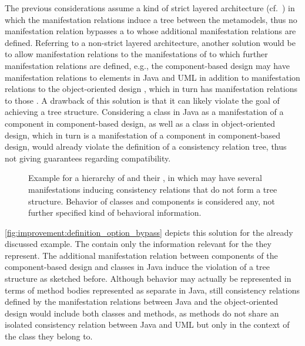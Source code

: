 The previous considerations assume a kind of strict layered architecture (cf.~\cite{buschmann1996PatternsArchitecture-Book}) in which the manifestation relations induce a tree between the metamodels, thus no manifestation relation bypasses a \conceptmetamodel to whose \commonalities additional manifestation relations are defined.
Referring to a non-strict layered architecture, another solution would be to allow manifestation relations to the manifestations of \conceptmetamodels to which further manifestation relations are defined, e.g., the component-based design \commonalities may have manifestation relations to elements in Java and \gls{UML} in addition to manifestation relations to the object-oriented design \conceptmetamodels, which in turn has manifestation relations to those \concretemetamodels.
A drawback of this solution is that it can likely violate the goal of achieving a tree structure.
Considering a class in Java as a manifestation of a component in component-based design, as well as a class in object-oriented design, which in turn is a manifestation of a component in component-based design, would already violate the definition of a consistency relation tree, thus not giving guarantees regarding compatibility.

\begin{figure}
    \centering
    
    \caption[\Commonalities with multiple manifestation]{Example for a hierarchy of \conceptmetamodels and their \commonalities, in which \commonalities may have several manifestations inducing consistency relations that do not form a tree structure. Behavior of classes and components is considered any, not further specified kind of behavioral information.}
    \label{fig:improvement:definition_option_bypass}
\end{figure}

\autoref{fig:improvement:definition_option_bypass} depicts this solution for the already discussed example.
The \conceptmetamodels contain only the information relevant for the \commonalities they represent.
The additional manifestation relation between components of the component-based design \conceptmetamodel and classes in Java induce the violation of a tree structure as sketched before.
Although behavior may actually be represented in terms of method bodies represented as separate \metaclasses in Java, still consistency relations defined by the manifestation relations between Java and the object-oriented design \conceptmetamodel would include both classes and methods, as methods do not share an isolated consistency relation between Java and \gls{UML} but only in the context of the class they belong to.


